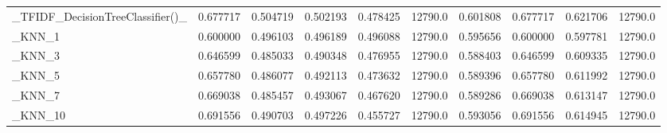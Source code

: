 \begin{tabular}{lrrrrrrrrr}
\_TFIDF\_DecisionTreeClassifier()\_                   &  0.677717 &         0.504719 &      0.502193 &        0.478425 &        12790.0 &            0.601808 &         0.677717 &           0.621706 &           12790.0 \\
\_KNN\_1                                             &  0.600000 &         0.496103 &      0.496189 &        0.496088 &        12790.0 &            0.595656 &         0.600000 &           0.597781 &           12790.0 \\
\_KNN\_3                                             &  0.646599 &         0.485033 &      0.490348 &        0.476955 &        12790.0 &            0.588403 &         0.646599 &           0.609335 &           12790.0 \\
\_KNN\_5                                             &  0.657780 &         0.486077 &      0.492113 &        0.473632 &        12790.0 &            0.589396 &         0.657780 &           0.611992 &           12790.0 \\
\_KNN\_7                                             &  0.669038 &         0.485457 &      0.493067 &        0.467620 &        12790.0 &            0.589286 &         0.669038 &           0.613147 &           12790.0 \\
\_KNN\_10                                            &  0.691556 &         0.490703 &      0.497226 &        0.455727 &        12790.0 &            0.593056 &         0.691556 &           0.614945 &           12790.0 \\
\bottomrule
\end{tabular}
